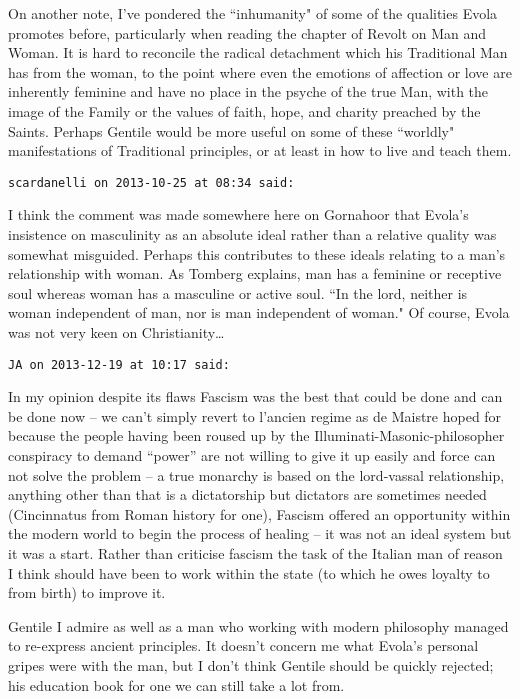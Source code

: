\begin{footnotesize}
\begin{sffamily}
On another note, I've pondered the ``inhumanity" of some of the qualities Evola promotes before, particularly when reading the chapter of Revolt on Man and Woman. It is hard to reconcile the radical detachment which his Traditional Man has from the woman, to the point where even the emotions of affection or love are inherently feminine and have no place in the psyche of the true Man, with the image of the Family or the values of faith, hope, and charity preached by the Saints. Perhaps Gentile would be more useful on some of these ``worldly" manifestations of Traditional principles, or at least in how to live and teach them.


\hfill

\texttt{scardanelli on 2013-10-25 at 08:34 said: }

I think the comment was made somewhere here on Gornahoor that Evola's insistence on masculinity as an absolute ideal rather than a relative quality was somewhat misguided. Perhaps this contributes to these ideals relating to a man's relationship with woman. As Tomberg explains, man has a feminine or receptive soul whereas woman has a masculine or active soul. ``In the lord, neither is woman independent of man, nor is man independent of woman." Of course, Evola was not very keen on Christianity…

\hfill

\texttt{JA on 2013-12-19 at 10:17 said:}

In my opinion despite its flaws Fascism was the best that could be done and can be done now – we can’t simply revert to l’ancien regime as de Maistre hoped for because the people having been roused up by the Illuminati-Masonic-philosopher conspiracy to demand “power” are not willing to give it up easily and force can not solve the problem – a true monarchy is based on the lord-vassal relationship, anything other than that is a dictatorship but dictators are sometimes needed (Cincinnatus from Roman history for one), Fascism offered an opportunity within the modern world to begin the process of healing – it was not an ideal system but it was a start. Rather than criticise fascism the task of the Italian man of reason I think should have been to work within the state (to which he owes loyalty to from birth) to improve it.

Gentile I admire as well as a man who working with modern philosophy managed to re-express ancient principles. It doesn’t concern me what Evola’s personal gripes were with the man, but I don’t think Gentile should be quickly rejected; his education book for one we can still take a lot from.


\end{sffamily}
\end{footnotesize}
